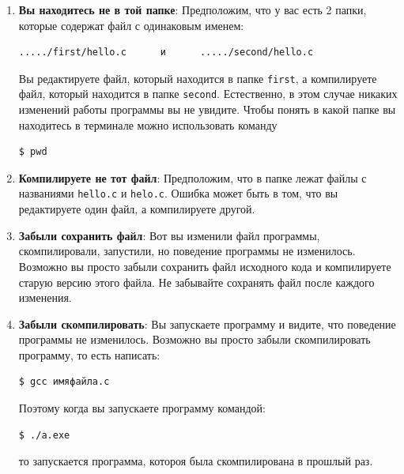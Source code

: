 \documentclass{article}
\begin{document}
\begin{enumerate}
\item \textbf{Вы находитесь не в той папке}:
Предположим, что у вас есть 2 папки, которые содержат файл с одинаковым именем:
\begin{lstlisting}[style=csMiptBash]
...../first/hello.c      и      ...../second/hello.c
\end{lstlisting}
Вы редактируете файл, который находится в папке \texttt{first}, а компилируете файл, который находится в папке \texttt{second}. Естественно, в этом случае никаких изменений работы программы вы не увидите.
Чтобы понять в какой папке вы находитесь в терминале можно использовать команду 
\begin{lstlisting}[style=csMiptBash]
$ pwd
\end{lstlisting}

\item \textbf{Компилируете не тот файл}:
Предположим, что в папке лежат файлы с названиями \texttt{hello.c} и \texttt{helo.c}.
Ошибка может быть в том, что вы редактируете один файл, а компилируете другой.

\item \textbf{Забыли сохранить файл}:
Вот вы изменили файл программы, скомпилировали, запустили, но поведение программы не изменилось.
Возможно вы просто забыли сохранить файл исходного кода и компилируете старую версию этого файла.
Не забывайте сохранять файл после каждого изменения.

\item \textbf{Забыли скомпилировать}:
Вы запускаете программу и видите, что поведение программы не изменилось.
Возможно вы просто забыли скомпилировать программу, то есть написать:
\begin{lstlisting}[style=csMiptBash]
$ gcc имяфайла.c
\end{lstlisting}
Поэтому когда вы запускаете программу командой:
\begin{lstlisting}[style=csMiptBash]
$ ./a.exe
\end{lstlisting}
то запускается программа, котороя была скомпилирована в прошлый раз.
\end{enumerate}
\end{document}

